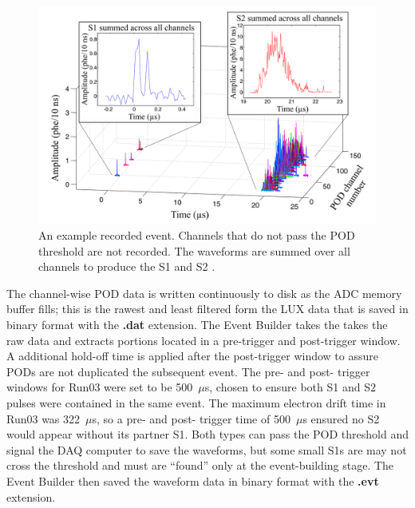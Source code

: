 \begin{figure}[htbp]
\begin{center}
\includegraphics[width=\textwidth]{figures/lux/sample_waveform.png}
\caption{An example recorded event. Channels that do not pass the POD threshold are not recorded. The waveforms are summed over all channels to produce the S1 and S2 \cite{LUXTrigger}. }
\label{fig:waveforms}
\end{center}
\end{figure}

The channel-wise \ac{POD} data is written continuously to disk as the \ac{ADC} memory buffer fills; this is the rawest and least filtered form the \ac{LUX} data that is saved in binary format with the \textbf{.dat} extension. The Event Builder takes the takes the raw data and extracts portions located in a pre-trigger and post-trigger window. A additional hold-off time is applied after the post-trigger window to assure \ac{POD}s are not duplicated the subsequent event. The pre- and post- trigger windows for Run03 were set to be 500~$\mu$s, chosen to ensure both S1 and S2 pulses were contained in the same event. The maximum electron drift time in Run03 was 322~$\mu$s, so a pre- and post- trigger time of 500~$\mu$s ensured no S2 would appear without its partner S1. Both types can pass the \ac{POD} threshold and signal the \ac{DAQ} computer to save the waveforms, but some small S1s are may not cross the threshold and must are ``found'' only at the event-building stage.
The Event Builder then saved the waveform data in binary format with the \textbf{.evt} extension.


